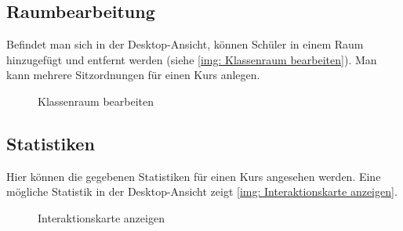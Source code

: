 \begin{figure}[H]
    \centering
    
    \label{img: Desktop Schülerauswahl}
\end{figure}

\begin{figure}[H]
\begin{minipage}{.5\textwidth}
    \centering
    
    \label{img: mobile Interaktionbewertung}
\end{minipage}
\begin{minipage}{.5\textwidth}
    \centering
    
    \label{img: Desktop Interaktionsbewertung}
\end{minipage}%
\end{figure}

\subsection{Raumbearbeitung}
Befindet man sich in der Desktop-Ansicht, können Schüler in einem Raum hinzugefügt und entfernt werden (siehe \autoref{img: Klassenraum bearbeiten}). Man kann mehrere Sitzordnungen für einen Kurs anlegen.
\begin{figure}[H]
    \centering
    
    \caption{Klassenraum bearbeiten}
    \label{img: Klassenraum bearbeiten}
\end{figure}

\subsection{Statistiken}
Hier können die gegebenen Statistiken für einen Kurs angesehen werden. Eine mögliche Statistik in der Desktop-Ansicht zeigt \autoref{img: Interaktionskarte anzeigen}.
\begin{figure}[H]
    \centering
    
    \caption{Interaktionskarte anzeigen}
    \label{img: Interaktionskarte anzeigen}
\end{figure}